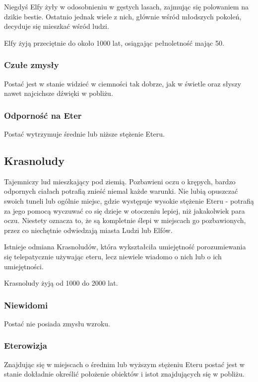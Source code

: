 \documentclass[10pt,a4paper]{book}
\begin{document}
\begin{multicols}{2}
Niegdyś Elfy żyły w odosobnieniu w gęstych lasach, zajmując się polowaniem na dzikie bestie. Ostatnio jednak wiele z nich, głównie wśród młodszych pokoleń, decyduje się mieszkać wśród ludzi.

Elfy żyją przeciętnie do około 1000 lat, osiągając pełnoletność mając 50.

\subsubsection*{Czułe zmysły}
Postać jest w stanie widzieć w ciemności tak dobrze, jak w świetle oraz słyszy nawet najcichsze dźwięki w pobliżu.

\subsubsection*{Odporność na Eter}
Postać wytrzymuje średnie lub niższe stężenie Eteru.



\subsection*{Krasnoludy}
Tajemniczy lud mieszkający pod ziemią. Pozbawieni oczu o krępych, bardzo odpornych ciałach potrafią znieść niemal każde warunki. Nie lubią opuszczać swoich tuneli lub ogólnie miejsc, gdzie występuje wysokie stężenie Eteru - potrafią za jego pomocą wyczuwać co się dzieje w otoczeniu lepiej, niż jakakolwiek para oczu. Niestety oznacza to, że są kompletnie ślepi w miejscach go pozbawionych, przez co niechętnie odwiedzają miasta Ludzi lub Elfów.

Istnieje odmiana Krasnoludów, która wykształciła umiejętność porozumiewania się telepatycznie używając eteru, lecz niewiele wiadomo o nich lub o ich umiejętności.

Krasnoludy żyją od 1000 do 2000 lat.

\subsubsection*{Niewidomi}
Postać nie posiada zmysłu wzroku.

\subsubsection*{Eterowizja}
Znajdując się w miejscach o średnim lub wyższym stężeniu Eteru postać jest w stanie dokładnie określić położenie obiektów i istot znajdujących się w pobliżu.


\end{multicols}
\end{document}
